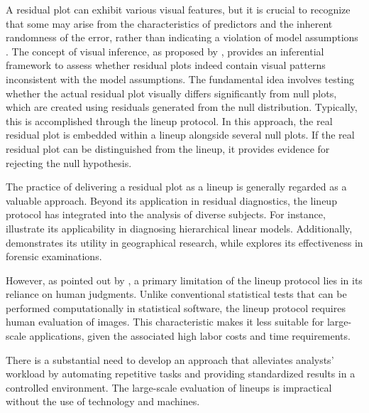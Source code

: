 \documentclass[]{interact}
\theoremstyle{plain}%
\theoremstyle{definition}
\theoremstyle{remark}
\begin{document}
A residual plot can exhibit various visual features, but it is crucial
to recognize that some may arise from the characteristics of predictors
and the inherent randomness of the error, rather than indicating a
violation of model assumptions \citep{li2023plot}. The concept of visual
inference, as proposed by \citet{buja2009statistical}, provides an
inferential framework to assess whether residual plots indeed contain
visual patterns inconsistent with the model assumptions. The fundamental
idea involves testing whether the actual residual plot visually differs
significantly from null plots, which are created using residuals
generated from the null distribution. Typically, this is accomplished
through the lineup protocol. In this approach, the real residual plot is
embedded within a lineup alongside several null plots. If the real
residual plot can be distinguished from the lineup, it provides evidence
for rejecting the null hypothesis.

The practice of delivering a residual plot as a lineup is generally
regarded as a valuable approach. Beyond its application in residual
diagnostics, the lineup protocol has integrated into the analysis of
diverse subjects. For instance,
\cite{loy2013diagnostic, loy2014hlmdiag, loy2015you} illustrate its
applicability in diagnosing hierarchical linear models. Additionally,
\citet{widen2016graphical} demonstrates its utility in geographical
research, while \citet{krishnan2021hierarchical} explores its
effectiveness in forensic examinations.

However, as pointed out by \citet{li2023plot}, a primary limitation of
the lineup protocol lies in its reliance on human judgments. Unlike
conventional statistical tests that can be performed computationally in
statistical software, the lineup protocol requires human evaluation of
images. This characteristic makes it less suitable for large-scale
applications, given the associated high labor costs and time
requirements.

There is a substantial need to develop an approach that alleviates
analysts' workload by automating repetitive tasks and providing
standardized results in a controlled environment. The large-scale
evaluation of lineups is impractical without the use of technology and
machines.
\end{document}
